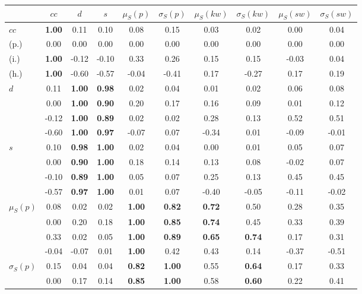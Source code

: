 \begin{table*}[h!]
\begin{center}
\begin{tabular}{| l || c | c | c | c | c | c | c | c | c |}\hline
 & $cc$ & $d$ & $s$ & $\mu_S(p)$ & $\sigma_S(p)$ & $\mu_S(kw)$ & $\sigma_S(kw)$ & $\mu_S(sw)$ & $\sigma_S(sw)$ \\\hline\hline
$cc$ & {\bf 1.00} & 0.11 & 0.10 & 0.08 & 0.15 & 0.03 & 0.02 & 0.00 & 0.04 \\
(p.) & 0.00  & 0.00  & 0.00  & 0.00  & 0.00  & 0.00  & 0.00  & 0.00  & 0.00 \\
(i.) & {\bf 1.00} & -0.12 & -0.10 & 0.33 & 0.26 & 0.15 & 0.15 & -0.03 & 0.04 \\
(h.) & {\bf 1.00} & -0.60 & -0.57 & -0.04 & -0.41 & 0.17 & -0.27 & 0.17 & 0.19 \\\hline
$d$ & 0.11 & {\bf 1.00} & {\bf 0.98} & 0.02 & 0.04 & 0.01 & 0.02 & 0.06 & 0.08 \\
 & 0.00 & {\bf 1.00} & {\bf 0.90} & 0.20 & 0.17 & 0.16 & 0.09 & 0.01 & 0.12 \\
 & -0.12 & {\bf 1.00} & {\bf 0.89} & 0.02 & 0.02 & 0.28 & 0.13 & 0.52 & 0.51 \\
 & -0.60 & {\bf 1.00} & {\bf 0.97} & -0.07 & 0.07 & -0.34 & 0.01 & -0.09 & -0.01 \\\hline
$s$ & 0.10 & {\bf 0.98} & {\bf 1.00} & 0.02 & 0.04 & 0.00 & 0.01 & 0.05 & 0.07 \\
 & 0.00 & {\bf 0.90} & {\bf 1.00} & 0.18 & 0.14 & 0.13 & 0.08 & -0.02 & 0.07 \\
 & -0.10 & {\bf 0.89} & {\bf 1.00} & 0.05 & 0.07 & 0.25 & 0.13 & 0.45 & 0.45 \\
 & -0.57 & {\bf 0.97} & {\bf 1.00} & 0.01 & 0.07 & -0.40 & -0.05 & -0.11 & -0.02 \\\hline
$\mu_S(p)$ & 0.08 & 0.02 & 0.02 & {\bf 1.00} & {\bf 0.82} & {\bf 0.72} & 0.50 & 0.28 & 0.35 \\
 & 0.00 & 0.20 & 0.18 & {\bf 1.00} & {\bf 0.85} & {\bf 0.74} & 0.45 & 0.33 & 0.39 \\
 & 0.33 & 0.02 & 0.05 & {\bf 1.00} & {\bf 0.89} & {\bf 0.65} & {\bf 0.74} & 0.17 & 0.31 \\
 & -0.04 & -0.07 & 0.01 & {\bf 1.00} & 0.42 & 0.43 & 0.14 & -0.37 & -0.51 \\\hline
$\sigma_S(p)$ & 0.15 & 0.04 & 0.04 & {\bf 0.82} & {\bf 1.00} & 0.55 & {\bf 0.64} & 0.17 & 0.33 \\
 & 0.00 & 0.17 & 0.14 & {\bf 0.85} & {\bf 1.00} & 0.58 & {\bf 0.60} & 0.22 & 0.41 \\

\end{tabular}
\end{center}
\end{table*}
